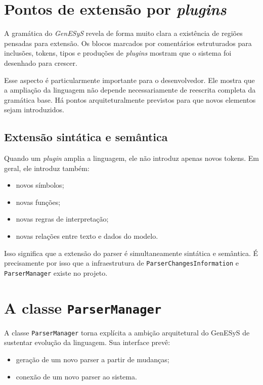 \section{Pontos de extensão por \textit{plugins}}
\label{sec:cap9_pontos_extensao_plugins}

A gramática do \textit{GenESyS} revela de forma muito clara a existência de regiões pensadas para extensão. Os blocos marcados por comentários estruturados para inclusões, tokens, tipos e produções de \textit{plugins} mostram que o sistema foi desenhado para crescer.

Esse aspecto é particularmente importante para o desenvolvedor. Ele mostra que a ampliação da linguagem não depende necessariamente de reescrita completa da gramática base. Há pontos arquiteturalmente previstos para que novos elementos sejam introduzidos.

\subsection{Extensão sintática e semântica}
\label{subsec:cap9_extensao_sintatica_semantica}

Quando um \textit{plugin} amplia a linguagem, ele não introduz apenas novos tokens. Em geral, ele introduz também:
\begin{itemize}
    \item novos símbolos;
    \item novas funções;
    \item novas regras de interpretação;
    \item novas relações entre texto e dados do modelo.
\end{itemize}

Isso significa que a extensão do parser é simultaneamente sintática e semântica. É precisamente por isso que a infraestrutura de \texttt{ParserChangesInformation} e \texttt{ParserManager} existe no projeto.

\section{A classe \texttt{ParserManager}}
\label{sec:cap9_classe_parsermanager}

A classe \texttt{ParserManager} torna explícita a ambição arquitetural do GenESyS de sustentar evolução da linguagem. Sua interface prevê:
\begin{itemize}
    \item geração de um novo parser a partir de mudanças;
    \item conexão de um novo parser ao sistema.
\end{itemize}

